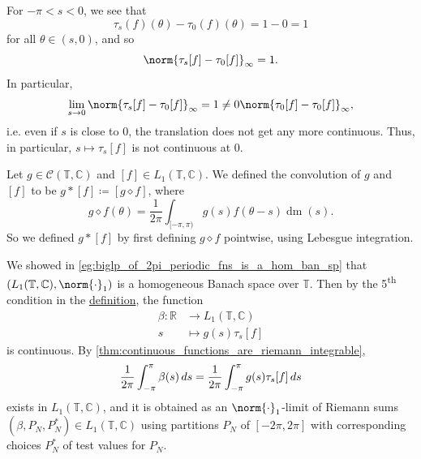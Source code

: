 \documentclass[notoc,notitlepage]{tufte-book}
\DeclareMathOperator{\dm}{dm}
\begin{document}
\begin{eg}
  For $-\pi < s < 0$, we see that
  \begin{equation*}
    \tau_s(f)(\theta) - \tau_0(f)(\theta) = 1 - 0 = 1
  \end{equation*}
  for all $\theta \in (s, 0)$,
  and so
  \begin{equation*}
    \norm{\tau_s[f] - \tau_0[f]}_\infty = 1.
  \end{equation*}
  In particular,
  \begin{equation*}
    \lim_{s \to 0} \norm{\tau_s[f] - \tau_0[f]}_\infty = 1 \neq 0
    \norm{\tau_0[f] - \tau_0[f]}_\infty,
  \end{equation*}
  i.e. even if $s$ is close to $0$, the translation does not
  get any more continuous.
  Thus, in particular, $s \mapsto \tau_s[f]$ is not continuous at $0$.
\end{eg}

Let $g \in \mathcal{C}(\mathbb{T}, \mathbb{C})$ and $[f] \in L_1(\mathbb{T}, \mathbb{C})$.
We defined the convolution of $g$ and $[f]$
to be $g * [f] \coloneqq [g \diamond f]$, where
\begin{equation*}
  g \diamond f(\theta) = \frac{1}{2\pi} \int_{[-\pi, \pi)}
    g(s) f(\theta - s) \dm(s).
\end{equation*}
So we defined $g * [f]$ by first defining $g \diamond f$ pointwise,
using Lebesgue integration.

We showed in \cref{eg:biglp_of_2pi_periodic_fns_is_a_hom_ban_sp}
that $(L_1(\mathbb{T}, \mathbb{C}), \norm{\cdot}_1)$ is
a homogeneous Banach space over $\mathbb{T}$.
Then by the 5\textsuperscript{th} condition in the
\hyperref[defn:homogeneous_banach_spaces]{definition}, the function
\begin{align*}
  \beta : \mathbb{R} &\to L_1(\mathbb{T}, \mathbb{C}) \\
                   s &\mapsto g(s) \tau_s[f]
\end{align*}
is continuous.
By \cref{thm:continuous_functions_are_riemann_integrable},
\begin{equation*}
  \frac{1}{2\pi} \int_{-\pi}^{\pi} \beta(s) \mathop{}\!d{s}
  = \frac{1}{2\pi} \int_{-\pi}^{\pi} g(s)\tau_s[f] \mathop{}\!d{s}
\end{equation*}
exists in $L_1(\mathbb{T}, \mathbb{C})$, and it is obtained
as an $\norm{\cdot}_1$-limit of Riemann sums
$(\beta, P_N, P_N^*) \in L_1(\mathbb{T}, \mathbb{C})$
using partitions $P_N$ of $[-2\pi, 2\pi]$
with corresponding choices $P_N^*$ of test values for $P_N$.
\end{document}
